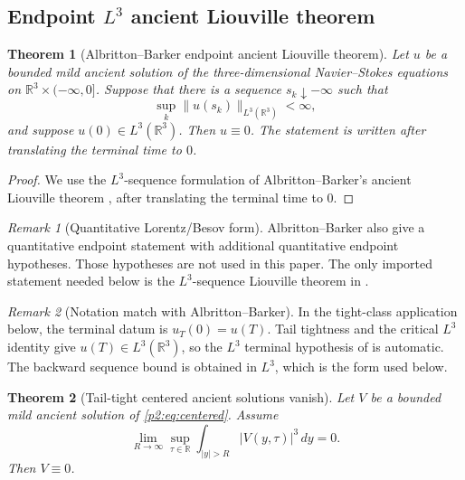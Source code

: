 \documentclass[11pt]{amsart}
\theoremstyle{plain}
\newtheorem{theorem}{Theorem}[section]
\theoremstyle{definition}
\theoremstyle{remark}
\newtheorem{remark}[remark]{Remark}
\numberwithin{equation}{section}
\newcommand{\R}{\mathbb R}
\begin{document}
\subsection{\texorpdfstring{Endpoint \(L^3\) ancient Liouville theorem}{Endpoint L3 ancient Liouville theorem}}

\begin{theorem}[Albritton--Barker endpoint ancient Liouville theorem]
\label{p2:thm:AB-endpoint}
Let \(u\) be a bounded mild ancient solution of the three-dimensional
Navier--Stokes equations on \(\R^3\times(-\infty,0]\).  Suppose that there
is a sequence \(s_k\downarrow-\infty\) such that
\[
   \sup_k\|u(s_k)\|_{L^3(\R^3)}<\infty,
\]
and suppose \(u(0)\in L^3(\R^3)\).  Then \(u\equiv0\).  The statement is
written after translating the terminal time to \(0\).
\end{theorem}

\begin{proof}
We use the \(L^3\)-sequence formulation of Albritton--Barker's ancient
Liouville theorem \cite[Theorem 1.2]{AlbrittonBarker2019}, after
translating the terminal time to \(0\).
\end{proof}

\begin{remark}[Quantitative Lorentz/Besov form]
\label{p2:rem:AB-quantitative}
Albritton--Barker also give a quantitative endpoint statement
\cite[Theorem 4.1]{AlbrittonBarker2019} with additional quantitative
endpoint hypotheses.  Those hypotheses are not used in this paper.  The only
imported statement needed below is the \(L^3\)-sequence Liouville theorem in
.
\end{remark}

\begin{remark}[Notation match with Albritton--Barker]
\label{p2:rem:AB-notation}
In the tight-class application below, the terminal datum is \(u_T(0)=u(T)\).
Tail tightness and the critical \(L^3\) identity give \(u(T)\in L^3(\R^3)\),
so the \(L^3\) terminal hypothesis of  is
automatic.  The backward sequence bound is obtained in \(L^3\), which is
the form used below.
\end{remark}

\begin{theorem}[Tail-tight centered ancient solutions vanish]
\label{p2:thm:tight-liouville}
Let \(V\) be a bounded mild ancient solution of \eqref{p2:eq:centered}.  Assume
\[
   \lim_{R\to\infty}
   \sup_{\tau\in\R}\int_{|y|>R}|V(y,\tau)|^3\,dy=0 .
\]
Then \(V\equiv0\).
\end{theorem}
\end{document}
